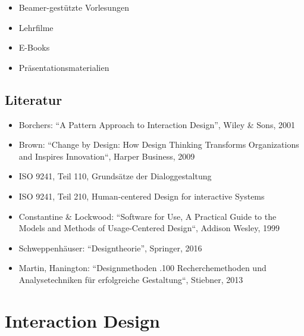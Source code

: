 \begin{itemize}
\tightlist
\item
  Beamer-gestützte Vorlesungen
\item
  Lehrfilme
\item
  E-Books
\item
  Präsentationsmaterialien
\end{itemize}

\section*{Literatur\label{/mi-2017/modulbeschreibungen-master/MA_HCI_Design_Methodologies}}\label{literaturpathlabelmi-2017modulbeschreibungen-mastermaux5fhciux5fdesignux5fmethodologies}

\begin{itemize}
\tightlist
\item
  Borchers: ``A Pattern Approach to Interaction Design'', Wiley \& Sons,
  2001
\item
  Brown: ``Change by Design: How Design Thinking Transforms
  Organizations and Inspires Innovation``, Harper Business, 2009
\item
  ISO 9241, Teil 110, Grundsätze der Dialoggestaltung
\item
  ISO 9241, Teil 210, Human-centered Design for interactive Systems
\item
  Constantine \& Lockwood: ``Software for Use, A Practical Guide to the
  Models and Methods of Usage-Centered Design``, Addison Wesley, 1999
\item
  Schweppenhäuser: ``Designtheorie'', Springer, 2016
\item
  Martin, Hanington: ``Designmethoden .100 Recherchemethoden und
  Analysetechniken für erfolgreiche Gestaltung``, Stiebner, 2013
\end{itemize}

\chapter{Interaction
Design\label{/mi-2017/modulbeschreibungen-master/MA_HCI_InteractionDesign}}\label{interaction-designpathlabelmi-2017modulbeschreibungen-mastermaux5fhciux5finteractiondesign}

